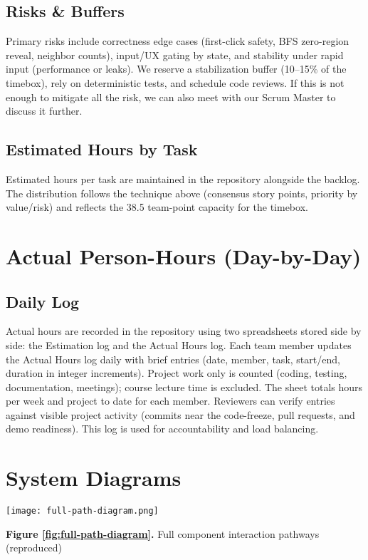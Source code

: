 \documentclass[11pt]{article}
\begin{document}
\subsection{Risks \& Buffers}
Primary risks include correctness edge cases (first-click safety, BFS zero-region reveal, neighbor counts), input/UX gating by state, and stability under rapid input (performance or leaks). We reserve a stabilization buffer (10–15\% of the timebox), rely on deterministic tests, and schedule code reviews. If this is not enough to mitigate all the risk, we can also meet with our Scrum Master to discuss it further.

\subsection{Estimated Hours by Task}
Estimated hours per task are maintained in the repository alongside the backlog. The distribution follows the technique above (consensus story points, priority by value/risk) and reflects the 38.5 team-point capacity for the timebox.

\section{Actual Person-Hours (Day-by-Day)}
\subsection{Daily Log}
Actual hours are recorded in the repository using two spreadsheets stored side by side: the Estimation log and the Actual Hours log. Each team member updates the Actual Hours log daily with brief entries (date, member, task, start/end, duration in integer increments). Project work only is counted (coding, testing, documentation, meetings); course lecture time is excluded. The sheet totals hours per week and project to date for each member. Reviewers can verify entries against visible project activity (commits near the code-freeze, pull requests, and demo readiness). This log is used for accountability and load balancing.

\clearpage
\section{System Diagrams}


\begin{center}
\texttt{[image: full-path-diagram.png]}

\textbf{Figure \ref{fig:full-path-diagram}.} Full component interaction pathways (reproduced)
\end{center}
\end{document}
